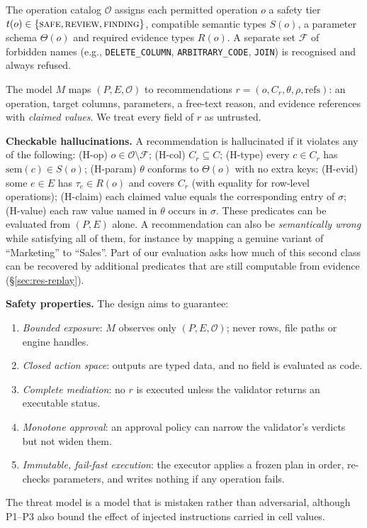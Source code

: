 The operation catalog $\mathcal{O}$ assigns each permitted operation $o$ a safety tier $t(o)\in\{\textsc{safe},\textsc{review},\textsc{finding}\}$, compatible semantic types $S(o)$, a parameter schema $\Theta(o)$ and required evidence types $R(o)$. A separate set $\mathcal{F}$ of forbidden names (e.g., \texttt{DELETE\_COLUMN}, \texttt{ARBITRARY\_CODE}, \texttt{JOIN}) is recognised and always refused.

The model $M$ maps $(P,E,\mathcal{O})$ to recommendations $r=(o,C_r,\theta,\rho,\mathrm{refs})$: an operation, target columns, parameters, a free-text reason, and evidence references with \emph{claimed values}. We treat every field of $r$ as untrusted.

\noindent\textbf{Checkable hallucinations.} A recommendation is hallucinated if it violates any of the following: (H-op) $o\in\mathcal{O}\setminus\mathcal{F}$; (H-col) $C_r\subseteq C$; (H-type) every $c\in C_r$ has $\mathrm{sem}(c)\in S(o)$; (H-param) $\theta$ conforms to $\Theta(o)$ with no extra keys; (H-evid) some $e\in E$ has $\tau_e\in R(o)$ and covers $C_r$ (with equality for row-level operations); (H-claim) each claimed value equals the corresponding entry of $\sigma$; (H-value) each raw value named in $\theta$ occurs in $\sigma$. These predicates can be evaluated from $(P,E)$ alone. A recommendation can also be \emph{semantically wrong} while satisfying all of them, for instance by mapping a genuine variant of ``Marketing'' to ``Sales''. Part of our evaluation asks how much of this second class can be recovered by additional predicates that are still computable from evidence (\S\ref{sec:res-replay}).

\noindent\textbf{Safety properties.} The design aims to guarantee:
\begin{enumerate}[label=\textbf{P\arabic*},leftmargin=*,nosep]
  \item \emph{Bounded exposure}: $M$ observes only $(P,E,\mathcal{O})$; never rows, file paths or engine handles.
  \item \emph{Closed action space}: outputs are typed data, and no field is evaluated as code.
  \item \emph{Complete mediation}: no $r$ is executed unless the validator returns an executable status.
  \item \emph{Monotone approval}: an approval policy can narrow the validator's verdicts but not widen them.
  \item \emph{Immutable, fail-fast execution}: the executor applies a frozen plan in order, re-checks parameters, and writes nothing if any operation fails.
\end{enumerate}
The threat model is a model that is mistaken rather than adversarial, although P1--P3 also bound the effect of injected instructions carried in cell values.
